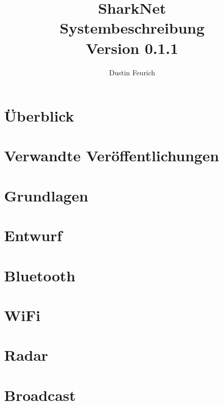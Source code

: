 \documentclass[german, 12pt]{book}
\begin{document}
	
\onehalfspacing

\title{SharkNet\\
Systembeschreibung \\
Version 0.1.1
}

\author{
Dustin Feurich
}

\maketitle

\tableofcontents

\chapter{Überblick}


\chapter{Verwandte Veröffentlichungen}


\chapter{Grundlagen}


\chapter{Entwurf}


\chapter{Bluetooth}


\chapter{WiFi}


\chapter{Radar}


\chapter{Broadcast}

\end{document}
